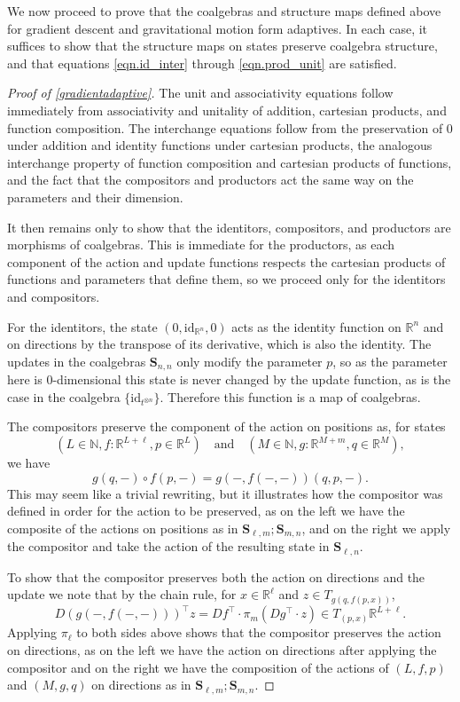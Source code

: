 \documentclass[11pt, one side, article]{memoir}
\theoremstyle{definition}
\theoremstyle{plain}
\newcommand{\Cat}[1]{\mathbf{#1}}%
\newcommand{\id}{\mathrm{id}}
\newcommand{\nn}{\mathbb{N}}
\newcommand{\rr}{\mathbb{R}}
\newcommand{\0}{\textsf{0}}
\newcommand{\1}{\tn{\textsf{1}}}
\renewcommand{\S}{{\Cat{S}}}
\newcommand{\idcoalg}[1]{{\{\id_{#1}\}}}
\begin{document}
We now proceed to prove that the coalgebras and structure maps defined above for gradient descent and gravitational motion form adaptives. In each case, it suffices to show that the structure maps on states preserve coalgebra structure, and that equations \eqref{eqn.id_inter} through \eqref{eqn.prod_unit} are satisfied.

\begin{proof}[Proof of \cref{gradientadaptive}]
The unit and associativity equations follow immediately from associativity and unitality of addition, cartesian products, and function composition. The interchange equations follow from the preservation of 0 under addition and identity functions under cartesian products, the analogous interchange property of function composition and cartesian products of functions, and the fact that the compositors and productors act the same way on the parameters and their dimension. 

It then remains only to show that the identitors, compositors, and productors are morphisms of coalgebras. This is immediate for the productors, as each component of the action and update functions respects the cartesian products of functions and parameters that define them, so we proceed only for the identitors and compositors.

For the identitors, the state $(0,\id_{\rr^n},0)$ acts as the identity function on $\rr^n$ and on directions by the transpose of its derivative, which is also the identity. The updates in the coalgebras $\S_{n,n}$ only modify the parameter $p$, so as the parameter here is 0-dimensional this state is never changed by the update function, as is the case in the coalgebra $\idcoalg{t^{\otimes n}}$. Therefore this function is a map of coalgebras.

The compositors preserve the component of the action on positions as, for states 
$$(L \in \nn, f : \rr^{L+\ell}, p \in \rr^L) \quad \textrm{and} \quad (M \in \nn, g : \rr^{M+m}, q \in \rr^M),$$ 
we have 
$$g(q,-) \circ f(p,-) = g(-,f(-,-))(q,p,-).$$
This may seem like a trivial rewriting, but it illustrates how the compositor was defined in order for the action to be preserved, as on the left we have the composite of the actions on positions as in $\S_{\ell,m};\S_{m,n}$, and on the right we apply the compositor and take the action of the resulting state in $\S_{\ell,n}$.

To show that the compositor preserves both the action on directions and the update we note that by the chain rule, for $x \in \rr^\ell$ and $z \in T_{g(q,f(p,x))}$,
$$D\left( g(-,f(-,-)) \right)^\top z = Df^\top \cdot \pi_m(Dg^\top \cdot z) \in T_{(p,x)}\rr^{L+\ell}.$$
Applying $\pi_\ell$ to both sides above shows that the compositor preserves the action on directions, as on the left we have the action on directions after applying the compositor and on the right we have the composition of the actions of $(L,f,p)$ and $(M,g,q)$ on directions as in $\S_{\ell,m};\S_{m,n}$.


\end{proof}
\end{document}
